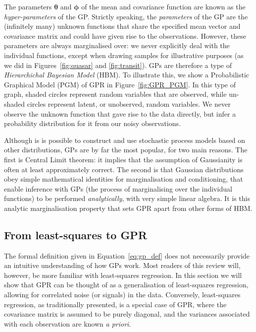 \documentclass[letterpaper]{ar-1col}
\newcommand{\hyperparams}{\ensuremath{\boldsymbol{\phi}}}
\newcommand{\meanparams}{\ensuremath{\boldsymbol{\theta}}}
\begin{document}
The parameters $\meanparams$ and $\hyperparams$ of the mean and covariance function are known as the \textit{hyper-parameters} of the GP. Strictly speaking, the \textit{parameters} of the GP are the (infinitely many) unknown functions that share the specified mean vector and covariance matrix and could have given rise to the observations. However, these parameters are always marginalised over: we never explicitly deal with the individual functions, except when drawing samples for illustrative purposes (as we did in Figures~\ref{fig:quasar} and \ref{fig:transit}). GPs are therefore a type of \textit{Hierarchichal Bayesian Model} (HBM). To illustrate this, we show a Probabilistic Graphical Model (PGM) of GPR in Figure~\ref{fig:GPR_PGM}. In this type of graph, shaded circles represent random variables that are observed, while un-shaded circles represent latent, or unobserved, random variables. We never observe the unknown function that gave rise to the data directly, but infer a probability distribution for it from our noisy observations.

Although is is possible to construct and use stochastic process models based on other distributions, GPs are by far the most popular, for two main reasons. The first is Central Limit theorem: it implies that the assumption of Gaussianity is often at least approximately correct. The second is that Gaussian distributions obey simple mathematical identities for marginalisation and conditioning, that enable inference with GPs (the process of marginalising over the individual functions) to be performed \textit{analytically}, with very simple linear algebra. It is this analytic marginalisation property that sets GPR apart from other forms of HBM. 

\subsection{From least-squares to GPR}
\label{sec:from_lsq}

The formal definition given in Equation~\ref{eq:gp_def} does not necessarily provide an intuitive understanding of how GPs work. Most readers of this review will, however, be more familiar with least-squares regression. In this section we will show that GPR can be thought of as a generalisation of least-squares regression, allowing for correlated noise (or signals) in the data. Conversely, least-squares regression, as traditionally presented, is a special case of GPR, where the covariance matrix is assumed to be purely diagonal, and the variances associated with each observation are known \textit{a priori}.
\end{document}
